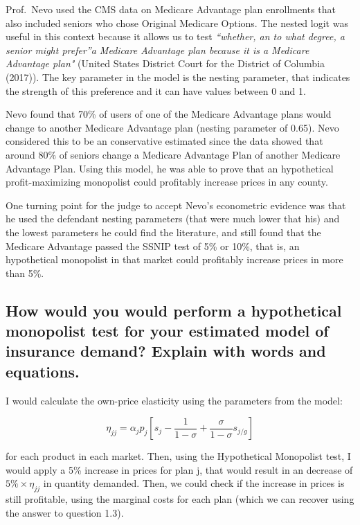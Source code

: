 \documentclass[]{article}
\begin{document}
Prof.~Nevo used the CMS data on Medicare Advantage plan enrollments that
also included seniors who chose Original Medicare Options. The nested
logit was useful in this context because it allows us to test
\emph{``whether, an to what degree, a senior might prefer''a Medicare
Advantage plan because it is a Medicare Advantage plan"} (United States
District Court for the District of Columbia (2017)). The key parameter
in the model is the nesting parameter, that indicates the strength of
this preference and it can have values between 0 and 1.

Nevo found that 70\% of users of one of the Medicare Advantage plans
would change to another Medicare Advantage plan (nesting parameter of
0.65). Nevo considered this to be an conservative estimated since the
data showed that around 80\% of seniors change a Medicare Advantage Plan
of another Medicare Advantage Plan. Using this model, he was able to
prove that an hypothetical profit-maximizing monopolist could profitably
increase prices in any county.

One turning point for the judge to accept Nevo's econometric evidence
was that he used the defendant nesting parameters (that were much lower
that his) and the lowest parameters he could find the literature, and
still found that the Medicare Advantage passed the SSNIP test of 5\% or
10\%, that is, an hypothetical monopolist in that market could
profitably increase prices in more than 5\%.

\hypertarget{how-would-you-would-perform-a-hypothetical-monopolist-test-for-your-estimated-model-of-insurance-demand-explain-with-words-and-equations.}{%
\subsection{How would you would perform a hypothetical monopolist test
for your estimated model of insurance demand? Explain with words and
equations.}\label{how-would-you-would-perform-a-hypothetical-monopolist-test-for-your-estimated-model-of-insurance-demand-explain-with-words-and-equations.}}

I would calculate the own-price elasticity using the parameters from the
model:

\[ \eta_{jj} = \alpha_j p_j [s_j - \frac{1}{1 - \sigma} + \frac{\sigma}{1 - \sigma} s_{j/g}] \]

for each product in each market. Then, using the Hypothetical Monopolist
test, I would apply a 5\% increase in prices for plan j, that would
result in an decrease of \(5\% \times \eta_{jj}\) in quantity demanded.
Then, we could check if the increase in prices is still profitable,
using the marginal costs for each plan (which we can recover using the
answer to question 1.3).
\end{document}
